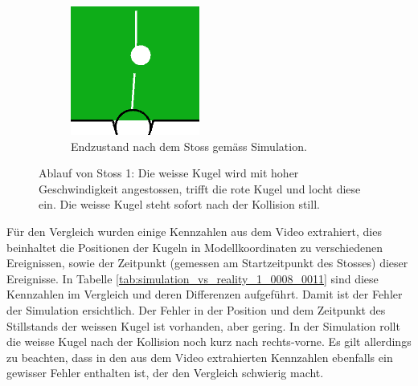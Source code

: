 \begin{figure}[h!]
\begin{subfigure}[t]{0.2\textwidth}
        \includegraphics[width=1.0\linewidth]{../common/04_results/resources/simulation_vs_reality/simulation_vs_reality_1_0008_0011_simulation_cut.png}
        \caption{Endzustand nach dem Stoss gemäss Simulation.}
        \label{fig:simulation_vs_reality_1_0008_0011_simulation}
    \end{subfigure}
    \caption{
        Ablauf von Stoss 1: Die weisse Kugel wird mit hoher Geschwindigkeit angestossen, trifft die rote Kugel und locht diese ein.
        Die weisse Kugel steht sofort nach der Kollision still.
    }
    \label{fig:simulation_vs_reality_1_0008_0011}
\end{figure}

Für den Vergleich wurden einige Kennzahlen aus dem Video extrahiert, dies beinhaltet die Positionen der Kugeln
in Modellkoordinaten zu verschiedenen Ereignissen, sowie der Zeitpunkt (gemessen am Startzeitpunkt des Stosses) dieser Ereignisse.
In Tabelle \ref{tab:simulation_vs_reality_1_0008_0011} sind diese Kennzahlen im Vergleich und deren Differenzen aufgeführt.
Damit ist der Fehler der Simulation ersichtlich.
Der Fehler in der Position und dem Zeitpunkt des Stillstands der weissen Kugel ist vorhanden, aber gering.
In der Simulation rollt die weisse Kugel nach der Kollision noch kurz nach rechts-vorne.
Es gilt allerdings zu beachten, dass in den aus dem Video extrahierten Kennzahlen ebenfalls ein
gewisser Fehler enthalten ist, der den Vergleich schwierig macht.

